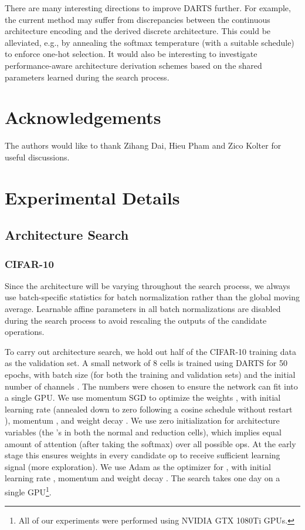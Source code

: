 \documentclass{article}
\begin{document}
There are many interesting directions to improve DARTS further.
For example,
the current method may suffer from discrepancies between the continuous architecture encoding and the derived discrete architecture.
This could be alleviated, e.g., by annealing the softmax temperature (with a suitable schedule) to enforce one-hot selection.
It would also be interesting to investigate performance-aware architecture derivation schemes based on the shared parameters learned during the search process.

 \section*{Acknowledgements}
 The authors would like to thank Zihang Dai, Hieu Pham and Zico Kolter for useful discussions.




\newpage
\appendix

\section{Experimental Details}
\subsection{Architecture Search}
\subsubsection{CIFAR-10}
\label{sec:search-cifar10}
Since the architecture will be varying throughout the search process,
we always use batch-specific statistics for batch normalization rather than the global moving average.
Learnable affine parameters in all batch normalizations are disabled during the search process to avoid rescaling the outputs of the candidate operations.

To carry out architecture search,
we hold out half of the CIFAR-10 training data as the validation set.
A small network of 8 cells is trained using DARTS for 50 epochs,
with batch size  (for both the training and validation sets) and the initial number of channels .
The numbers were chosen to ensure the network can fit into a single GPU.
We use momentum SGD to optimize the weights ,
with initial learning rate  (annealed down to zero following a cosine schedule without restart \citep{loshchilov2016sgdr}),
momentum , and weight decay .
We use zero initialization for architecture variables (the 's in both the normal and reduction cells), which implies equal amount of attention (after taking the softmax) over all possible ops. At the early stage this ensures weights in every candidate op to receive sufficient learning signal (more exploration).
We use Adam \citep{kingma2014adam} as the optimizer for ,
with initial learning rate , momentum  and weight decay . The search takes one day on a single GPU\footnote{All of our experiments were performed using NVIDIA GTX 1080Ti GPUs.}.
\end{document}
